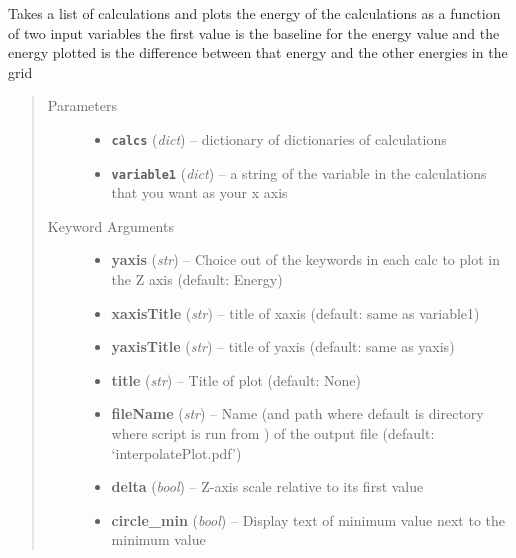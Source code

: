 \documentclass[letterpaper,10pt,english]{sphinxmanual}
\begin{document}

\begin{fulllineitems}
\label{plot:plot.interpolatePlot1D}
Takes a list of calculations and plots the energy of the calculations as a function of two input variables
the first value is the baseline for the energy value and the energy plotted is the difference between that
energy and the other energies in the grid
\begin{quote}\begin{description}
\item[{Parameters}] \leavevmode\begin{itemize}
\item {} 
\textbf{\texttt{calcs}} (\emph{dict}) -- dictionary of dictionaries of calculations

\item {} 
\textbf{\texttt{variable1}} (\emph{dict}) -- a string of the variable in the calculations that you want as your x axis

\end{itemize}

\item[{Keyword Arguments}] \leavevmode\begin{itemize}
\item {} 
\textbf{yaxis} (\emph{str}) --
Choice out of the keywords in each calc to plot in the Z axis (default: Energy)

\item {} 
\textbf{xaxisTitle} (\emph{str}) --
title of xaxis (default: same as variable1)

\item {} 
\textbf{yaxisTitle} (\emph{str}) --
title of yaxis (default: same as yaxis)

\item {} 
\textbf{title} (\emph{str}) --
Title of plot (default: None)

\item {} 
\textbf{fileName} (\emph{str}) --
Name (and path where default is directory where script is run from ) of the
output file (default: `interpolatePlot.pdf')

\item {} 
\textbf{delta} (\emph{bool}) --
Z-axis scale relative to its first value

\item {} 
\textbf{circle\_min} (\emph{bool}) --
Display text of minimum value next to the minimum value

\end{itemize}

\end{description}\end{quote}

\end{fulllineitems}
\end{document}
